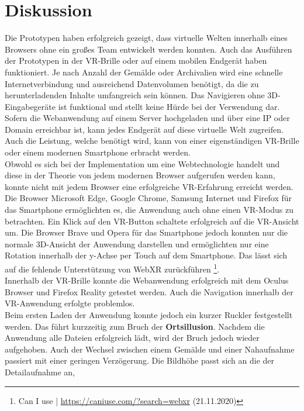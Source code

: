 \documentclass[a4paper,12pt,oneside]{article}
\begin{document}
  \section{Diskussion}
    Die Prototypen haben erfolgreich gezeigt, dass virtuelle Welten innerhalb
    eines Browsers ohne ein großes Team entwickelt werden konnten. Auch das
    Ausführen der Prototypen in der VR-Brille oder auf einem mobilen Endgerät haben 
    funktioniert. Je nach Anzahl der Gemälde oder Archivalien wird
    eine schnelle Internetverbindung und ausreichend Datenvolumen benötigt,
    da die zu herunterladenden Inhalte umfangreich sein können. Das
    Navigieren ohne 3D-Eingabegeräte ist funktional und stellt keine Hürde
    bei der Verwendung dar.
    Sofern die Webanwendung auf einem Server hochgeladen und über eine IP
    oder Domain erreichbar ist, kann jedes Endgerät auf diese virtuelle Welt zugreifen.
    Auch die Leistung, welche benötigt wird, kann von einer eigenständigen
    VR-Brille oder einem modernen Smartphone erbracht werden. \\
    Obwohl es sich bei der Implementation um eine Webtechnologie handelt
    und diese in der Theorie von jedem modernen Browser aufgerufen werden
    kann, konnte nicht mit jedem Browser eine erfolgreiche VR-Erfahrung
    erreicht werden. Die Browser Microsoft Edge, Google Chrome, Samsung
    Internet und Firefox für das Smartphone ermöglichten es, die Anwendung 
    auch ohne einen VR-Modus zu betrachten. Ein Klick auf den VR-Button 
    schaltete erfolgreich
    auf die VR-Ansicht um. Die Browser Brave und Opera für das Smartphone 
    jedoch konnten nur
    die normale 3D-Ansicht der Anwendung darstellen und ermöglichten nur
    eine Rotation innerhalb der y-Achse per Touch auf dem Smartphone. 
    Das lässt sich auf die fehlende Unterstützung von WebXR zurückführen \footnote{Can I use | \url{https://caniuse.com/?search=webxr} (21.11.2020)}. \\
    Innerhalb der VR-Brille konnte die Webanwendung erfolgreich mit dem
    Oculus Browser und Firefox Reality getestet werden. Auch die Navigation
    innerhalb der VR-Anwendung erfolgte problemlos. \\
    Beim ersten Laden der
    Anwendung konnte jedoch ein kurzer Ruckler festgestellt werden. Das 
    führt kurzzeitig zum Bruch der \textbf{Ortsillusion}. Nachdem 
    die Anwendung alle Dateien erfolgreich lädt, wird der Bruch
    jedoch wieder aufgehoben.
    Auch der Wechsel zwischen einem Gemälde und einer Nahaufnahme passiert
    mit einer geringen Verzögerung.
    Die Bildhöhe passt sich an die der Detailaufnahme an,
\end{document}
